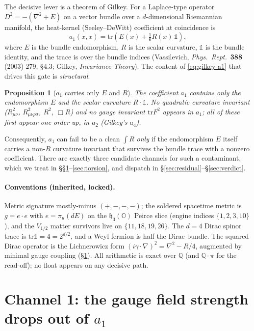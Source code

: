 \documentclass[11pt]{article}
\newtheorem{proposition}{Proposition}
\newcommand{\h}{\mathfrak{h}}
\newcommand{\Oo}{\mathbb{O}}
\newcommand{\QQ}{\mathbb{Q}}
\newcommand{\tr}{\mathrm{tr}}
\begin{document}
The decisive lever is a theorem of Gilkey. For a Laplace-type operator $D^2=-(\nabla^2+E)$
on a vector bundle over a $d$-dimensional Riemannian manifold, the heat-kernel
(Seeley--DeWitt) coefficient at coincidence is
\begin{equation}\label{eq:gilkey-a1}
a_1(x,x)=\tr\!\left(E(x)+\tfrac{1}{6}R(x)\,\mathbb{1}\right),
\end{equation}
where $E$ is the bundle endomorphism, $R$ is the scalar curvature, $\mathbb{1}$ is the
bundle identity, and the trace is over the bundle indices (Vassilevich,
\textit{Phys.\ Rept.}\ \textbf{388} (2003) 279, \S4.3; Gilkey, \textit{Invariance Theory}).
The content of \eqref{eq:gilkey-a1} that drives this gate is \emph{structural}:
\begin{proposition}[$a_1$ carries only $E$ and $R$]\label{prop:a1-structure}
The coefficient $a_1$ contains \emph{only} the endomorphism $E$ and the scalar curvature
$R\cdot\mathbb{1}$. No quadratic curvature invariant
($R_{\mu\nu}^2$, $R_{\mu\nu\rho\sigma}^2$, $R^2$, $\Box R$) and no gauge invariant
$\tr F^2$ appears in $a_1$; all of these first appear one order up, in $a_2$ (Gilkey's
$a_4$).
\end{proposition}
Consequently, $a_1$ can fail to be a clean $\int R$ \emph{only} if the endomorphism $E$
itself carries a non-$R$ curvature invariant that survives the bundle trace with a nonzero
coefficient. There are exactly three candidate channels for such a contaminant, which we
treat in \S\S\ref{sec:gauge}--\ref{sec:torsion}, and dispatch in
\S\ref{sec:residual}--\S\ref{sec:verdict}.

\paragraph{Conventions (inherited, locked).} Metric signature mostly-minus
$(+,-,-,-)$; the soldered spacetime metric is $g=e\cdot e$ with $e=\pi_u(dE)$ on the
$\h_3(\Oo)$ Peirce slice (engine indices $\{1,2,3,10\}$), and the $V_{1/2}$ matter survivors
live on $\{11,18,19,26\}$. The $d=4$ Dirac spinor trace is $\tr\mathbb{1}=4=2^{d/2}$, and a
Weyl fermion is half the Dirac bundle. The squared Dirac operator is the Lichnerowicz form
$(i\gamma\!\cdot\!\nabla)^2=\nabla^2-R/4$, augmented by minimal gauge coupling (\S\ref{sec:gauge}).
All arithmetic is exact over $\QQ$ (and $\QQ\!\cdot\!\pi$ for the read-off); no float appears
on any decisive path.

\section{Channel 1: the gauge field strength drops out of $a_1$}\label{sec:gauge}
\end{document}
